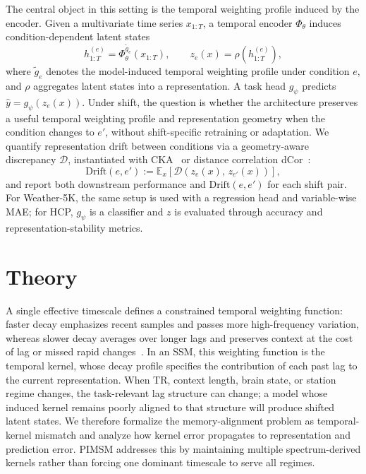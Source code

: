 \documentclass{article}
\begin{document}
The central object in this setting is the temporal weighting profile induced by the encoder.
Given a multivariate time series $x_{1:T}$, a temporal encoder $\Phi_{\theta}$ induces condition-dependent latent states
\begin{equation}
h_{1:T}^{(e)}=\Phi_{\theta}^{\tilde g_e}(x_{1:T}),
\qquad
z_e(x)=\rho(h_{1:T}^{(e)}),
\label{eq:encoder_kernel_setup}
\end{equation}
where $\tilde g_e$ denotes the model-induced temporal weighting profile under condition $e$, and $\rho$ aggregates latent states into a representation.
A task head $g_{\psi}$ predicts $\hat y=g_{\psi}(z_e(x))$.
Under shift, the question is whether the architecture preserves a useful temporal weighting profile and representation geometry when the condition changes to $e'$, without shift-specific retraining or adaptation.
We quantify representation drift between conditions via a geometry-aware discrepancy $\mathcal{D}$, instantiated with CKA~\citep{kornblith2019similarity} or distance correlation dCor~\citep{szekely2007measuring}:
\begin{equation}
\mathrm{Drift}(e,e') := \mathbb{E}_{x}\!\left[\mathcal{D}\!\left(z_e(x),\, z_{e'}(x)\right)\right],
\label{eq:drift_def}
\end{equation}
and report both downstream performance and $\mathrm{Drift}(e,e')$ for each shift pair.
For Weather-5K, the same setup is used with a regression head and variable-wise MAE; for HCP, $g_{\psi}$ is a classifier and $z$ is evaluated through accuracy and representation-stability metrics.



\section{Theory}
\label{sec:theory}

A single effective timescale defines a constrained temporal weighting function: faster decay emphasizes recent samples and passes more high-frequency variation, whereas slower decay averages over longer lags and preserves context at the cost of lag or missed rapid changes~\citep{oppenheim1999discrete,brown1959statistical}.
In an SSM, this weighting function is the temporal kernel, whose decay profile specifies the contribution of each past lag to the current representation.
When TR, context length, brain state, or station regime changes, the task-relevant lag structure can change; a model whose induced kernel remains poorly aligned to that structure will produce shifted latent states.
We therefore formalize the memory-alignment problem as temporal-kernel mismatch and analyze how kernel error propagates to representation and prediction error.
PIMSM addresses this by maintaining multiple spectrum-derived kernels rather than forcing one dominant timescale to serve all regimes.
\end{document}
